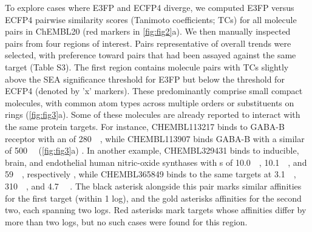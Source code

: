 \documentclass[../../main.tex]{subfiles}
\begin{document}
\begin{refsection}
	To explore cases where E3FP and ECFP4 diverge, we computed E3FP versus ECFP4 pairwise similarity scores (Tanimoto coefficients; TCs) for all molecule pairs in ChEMBL20 (red markers in \cref{fig:fig2}a).
	We then manually inspected pairs from four regions of interest.
	Pairs representative of overall trends were selected, with preference toward pairs that had been assayed against the same target (Table S3).
	The first region contains molecule pairs with TCs slightly above the SEA significance threshold for E3FP but below the threshold for ECFP4  (denoted by 'x' markers).
	These predominantly comprise small compact molecules, with common atom types across multiple orders or substituents on rings (\cref{fig:fig3}a).
	Some of these molecules are already reported to interact with the same protein targets.
	For instance, CHEMBL113217 binds to GABA-B receptor with an \ICfifty{} of \SI{280}{\nano\molar}, while CHEMBL113907 binds GABA-B with a similar \ICfifty{} of \SI{500}{\nano\molar} (\cref{fig:fig3}a) \supercite{froestl_1995}.
	In another example, CHEMBL329431 binds to inducible, brain, and endothelial human nitric-oxide synthases with  \ICfifty s of \SI{10.0}{\micro\molar}, \SI{10.1}{\micro\molar}, and   \SI{59}{\micro\molar}, respectively \supercite{moormann_2001}, while CHEMBL365849 binds to the same targets at \SI{3.1}{\micro\molar},  \SI{310}{\nano\molar}, and \SI{4.7}{\micro\molar} \supercite{shankaran_2004a}.
	The black asterisk alongside this pair marks similar affinities for the first target (within 1 log), and the gold asterisks affinities for the second two, each spanning two logs.
	Red asterisks mark targets whose affinities differ by more than two logs, but no such cases were found for this region.


\end{refsection}
\end{document}
